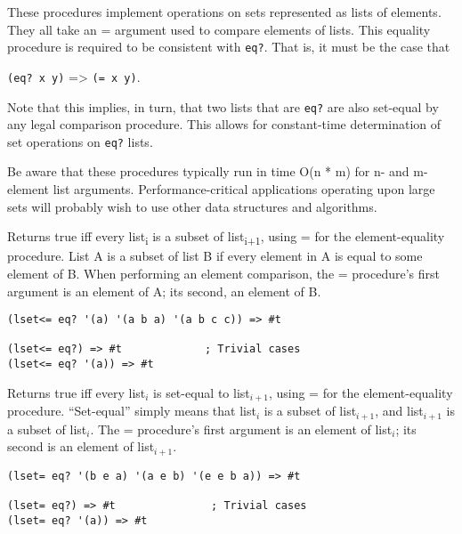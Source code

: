 These procedures implement operations on sets represented as lists of
elements. They all take an = argument used to compare elements of lists.
This equality procedure is required to be consistent with \texttt{eq?}.
That is, it must be the case that

\texttt{(eq?\ x\ y)} =\textgreater{} \texttt{(=\ x\ y)}.

Note that this implies, in turn, that two lists that are \texttt{eq?}
are also set-equal by any legal comparison procedure. This allows for
constant-time determination of set operations on \texttt{eq?} lists.

Be aware that these procedures typically run in time O(n * m) for n- and
m-element list arguments. Performance-critical applications operating
upon large sets will probably wish to use other data structures and
algorithms.

\begin{entry}{%
  }

  Returns true iff every list\textsubscript{i} is a subset
  of list\textsubscript{i+1}, using = for the element-equality
  procedure.  List A is a subset of list B if every element in A is
  equal to some element of B. When performing an element comparison,
  the = procedure's first argument is an element of A; its second, an
  element of B.

\begin{verbatim}
(lset<= eq? '(a) '(a b a) '(a b c c)) => #t

(lset<= eq?) => #t             ; Trivial cases
(lset<= eq? '(a)) => #t
\end{verbatim}
\end{entry}

\begin{entry}{%
  }

Returns true iff every list$_i$ is set-equal to list$_{i+1}$, using =
for the element-equality procedure.  ``Set-equal'' simply means that
list$_i$ is a subset of list$_{i+1}$, and list$_{i+1}$ is a subset of
list$_i$. The = procedure's first argument is an element of list$_i$;
its second is an element of list$_{i+1}$.

\begin{verbatim}
(lset= eq? '(b e a) '(a e b) '(e e b a)) => #t

(lset= eq?) => #t               ; Trivial cases
(lset= eq? '(a)) => #t
\end{verbatim}
\end{entry}

